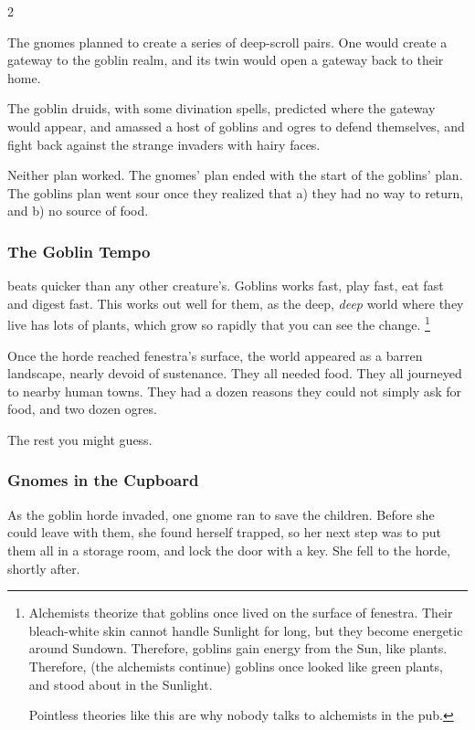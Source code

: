 \begin{multicols}{2}
\begin{exampletext}
  The gnomes planned to create a series of \gls{deep}-scroll pairs.
  One would create a gateway to the goblin realm, and its twin would open a gateway back to their home.

  The goblin druids, with some divination spells, predicted where the gateway would appear, and amassed a host of goblins and \glspl{ogre} to defend themselves, and fight back against the strange invaders with hairy faces. 

  Neither plan worked.
  The gnomes' plan ended with the start of the goblins' plan.
  The goblins plan went sour once they realized that a) they had no way to return, and b) no source of food.

  \subsubsection{The Goblin Tempo}
  beats quicker than any other creature's.
  Goblins works fast, play fast, eat fast and digest fast.
  This works out well for them, as the deep, \emph{deep} world where they live has lots of plants, which grow so rapidly that you can see the change.%
  \footnote{Alchemists theorize that goblins once lived on the surface of \gls{fenestra}.
  Their bleach-white skin cannot handle Sunlight for long, but they become energetic around Sundown.
  Therefore, goblins gain energy from the Sun, like plants.
  Therefore, (the alchemists continue) goblins once looked like green plants, and stood about in the Sunlight.

  Pointless theories like this are why nobody talks to alchemists in the pub.}

  Once the horde reached \gls{fenestra}'s surface, the world appeared as a barren landscape, nearly devoid of sustenance.
  They all needed food.
  They all journeyed to nearby human towns.
  They had a dozen reasons they could not simply ask for food, and two dozen \glspl{ogre}.

  The rest you might guess.

\end{exampletext}

\subsubsection{Gnomes in the Cupboard}
\label{saving_the_children}

\begin{exampletext}
  As the goblin horde invaded, one gnome ran to save the children.
  Before she could leave with them, she found herself trapped, so her next step was to put them all in a storage room, and lock the door with a key.
  She fell to the horde, shortly after.


\end{exampletext}
\end{multicols}
